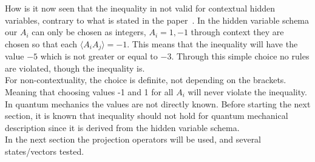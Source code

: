 How is it now seen that the inequality in not valid for contextual hidden variables, contrary to what is stated in the paper~\cite{PhysRevLett.101.020403}. In the hidden variable schema our $A_i$ can only be chosen as integers, $A_i = 1, -1$ through context they are chosen so that each $\langle A_iA_j \rangle = -1$. This means that the inequality will have the value $-5$ which is not greater or equal to $-3$. Through this simple choice no rules are violated, though the inequality is. \\
For non-contextuality, the choice is definite, not depending on the brackets. Meaning that choosing values  -1 and 1 for all $A_i$ will never violate the inequality. In quantum mechanics the values are not directly known. Before starting the next section, it is known that inequality should not hold for quantum mechanical description since it is derived from the hidden variable schema.
\\
In the next section the projection operators will be used, and several states/vectors tested.